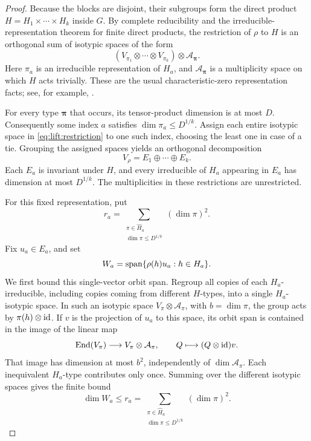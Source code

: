\begin{proof}
Because the blocks are disjoint, their subgroups form the direct product
\(H=H_1\times\cdots\times H_k\) inside \(G\). By complete reducibility
and the irreducible-representation theorem for finite direct products,
the restriction of \(\rho\) to \(H\) is an orthogonal sum of isotypic
spaces of the form
\begin{equation}
\label{eq:lift:restriction}
  (V_{\pi_1}\otimes\cdots\otimes V_{\pi_k})
       \otimes \mathcal A_{\boldsymbol\pi}.
\end{equation}
Here \(\pi_a\) is an irreducible representation of \(H_a\), and
\(\mathcal A_{\boldsymbol\pi}\) is a multiplicity space on which \(H\)
acts trivially. These are the usual characteristic-zero representation
facts; see, for example, \cite{sagan,etingof}.

For every type \(\boldsymbol\pi\) that occurs, its tensor-product
dimension is at most \(D\). Consequently some index \(a\) satisfies
\(\dim\pi_a\le D^{1/k}\). Assign each entire isotypic space in
\eqref{eq:lift:restriction} to one such index, choosing the least one
in case of a tie. Grouping the assigned spaces yields an orthogonal
decomposition
\[
  V_\rho=E_1\oplus\cdots\oplus E_k.
\]
Each \(E_a\) is invariant under \(H\), and every irreducible of \(H_a\)
appearing in \(E_a\) has dimension at most \(D^{1/k}\). The multiplicities
in these restrictions are unrestricted.

For this fixed representation, put
\[
  r_a=\sum_{\substack{\pi\in\widehat H_a\\\dim\pi\le D^{1/k}}}
                (\dim\pi)^2.
\]
Fix \(u_a\in E_a\), and set
\[
  W_a=\operatorname{span}\{\rho(h)u_a:h\in H_a\}.
\]
We first bound this single-vector orbit span. Regroup all copies of each
\(H_a\)-irreducible, including copies coming from different \(H\)-types,
into a single \(H_a\)-isotypic space. In such an isotypic
space \(V_\pi\otimes\mathcal A_\pi\), with \(b=\dim\pi\), the group
acts by \(\pi(h)\otimes\mathrm{id}\). If \(v\) is the projection of \(u_a\)
to this space, its orbit span is contained in the image of the linear map
\[
  \operatorname{End}(V_\pi)\longrightarrow
          V_\pi\otimes\mathcal A_\pi,
  \qquad Q\longmapsto (Q\otimes\mathrm{id})v.
\]
That image has dimension at most \(b^2\), independently of
\(\dim\mathcal A_\pi\). Each inequivalent \(H_a\)-type contributes only
once. Summing over the different isotypic spaces gives the finite bound
\begin{equation}
  \dim W_a\le r_a
  =\sum_{\substack{\pi\in\widehat H_a\\\dim\pi\le D^{1/k}}}
                         (\dim\pi)^2.
\label{eq:lift:orbit-dimension}
\end{equation}


\end{proof}
